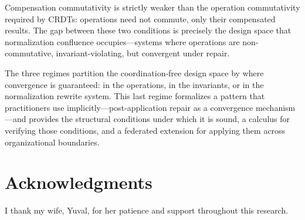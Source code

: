 \documentclass[11pt,a4paper]{article}
\theoremstyle{plain}
\theoremstyle{definition}
\theoremstyle{remark}
\renewcommand{\_}{\textunderscore\allowbreak}
\begin{document}
Compensation commutativity is strictly weaker than the operation commutativity
required by CRDTs: operations need not commute, only their compensated results.
The gap between these two conditions is precisely the design space that
normalization confluence occupies---systems where operations are
non-commutative, invariant-violating, but convergent under repair.

The three regimes partition the coordination-free design space by where
convergence is guaranteed: in the operations, in the invariants, or in the
normalization rewrite system.  This last regime formalizes a pattern that
practitioners use implicitly---post-application repair as a convergence
mechanism---and provides the structural conditions under which it is sound, a
calculus for verifying those conditions, and a federated extension for
applying them across organizational boundaries.

\section*{Acknowledgments}

I thank my wife, Yuval, for her patience and support throughout this research.
\end{document}
